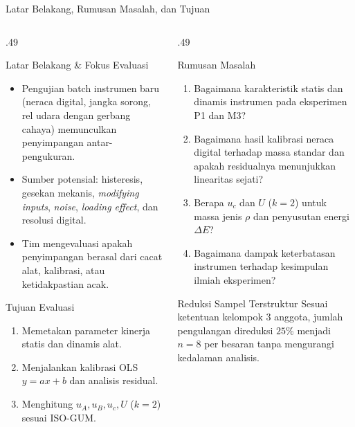 \documentclass[aspectratio=169,10pt]{beamer}
\newcommand{\xs}{\fontsize{7.1}{9}\selectfont}
\newcommand{\uc}{u_{c}}
\newcommand{\uA}{u_{A}}
\newcommand{\uB}{u_{B}}
\begin{document}
\begin{frame}{Latar Belakang, Rumusan Masalah, dan Tujuan}
\begin{columns}[T,onlytextwidth]
\begin{column}{.49\textwidth}
\begin{block}{Latar Belakang \& Fokus Evaluasi}\xs
\begin{itemize}
\item Pengujian batch instrumen baru (neraca digital, jangka sorong, rel udara dengan gerbang cahaya) memunculkan penyimpangan antar-pengukuran.
\item Sumber potensial: histeresis, gesekan mekanis, \textit{modifying inputs}, \textit{noise}, \textit{loading effect}, dan resolusi digital.
\item Tim mengevaluasi apakah penyimpangan berasal dari cacat alat, kalibrasi, atau ketidakpastian acak.
\end{itemize}
\end{block}
\begin{exampleblock}{Tujuan Evaluasi}\xs
\begin{enumerate}
\item Memetakan parameter kinerja statis dan dinamis alat.
\item Menjalankan kalibrasi OLS $y=ax+b$ dan analisis residual.
\item Menghitung $\uA, \uB, \uc, U$ ($k=2$) sesuai ISO-GUM.
\end{enumerate}
\end{exampleblock}
\end{column}

\begin{column}{.49\textwidth}
\begin{block}{Rumusan Masalah}\xs
\begin{enumerate}
\item Bagaimana karakteristik statis dan dinamis instrumen pada eksperimen P1 dan M3?
\item Bagaimana hasil kalibrasi neraca digital terhadap massa standar dan apakah residualnya menunjukkan linearitas sejati?
\item Berapa $\uc$ dan $U$ ($k=2$) untuk massa jenis $\rho$ dan penyusutan energi $\Delta E$?
\item Bagaimana dampak keterbatasan instrumen terhadap kesimpulan ilmiah eksperimen?
\end{enumerate}
\end{block}
\begin{alertblock}{Reduksi Sampel Terstruktur}\xs
Sesuai ketentuan kelompok $3$ anggota, jumlah pengulangan direduksi $25\%$ menjadi $n=8$ per besaran tanpa mengurangi kedalaman analisis.
\end{alertblock}
\end{column}
\end{columns}
\end{frame}
\end{document}
